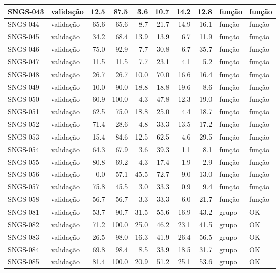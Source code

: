 \begin{small}
\begin{longtable}{|l|l|r|r|r|r|r|r|l|l|}
SNGS-043 & validação & 12.5 & 87.5 & 3.6 & 10.7 & 14.2 & 12.8 & função & função \\ \hline
SNGS-044 & validação & 65.6 & 65.6 & 8.7 & 21.7 & 14.9 & 16.1 & função & função \\ \hline
SNGS-045 & validação & 34.2 & 68.4 & 13.9 & 13.9 & 6.7 & 11.9 & função & função \\ \hline
SNGS-046 & validação & 75.0 & 92.9 & 7.7 & 30.8 & 6.7 & 35.7 & função & função \\ \hline
SNGS-047 & validação & 11.5 & 11.5 & 7.7 & 23.1 & 4.1 & 5.2 & função & função \\ \hline
SNGS-048 & validação & 26.7 & 26.7 & 10.0 & 70.0 & 16.6 & 16.4 & função & função \\ \hline
SNGS-049 & validação & 10.0 & 90.0 & 18.8 & 18.8 & 19.6 & 8.6 & função & função \\ \hline
SNGS-050 & validação & 60.9 & 100.0 & 4.3 & 47.8 & 12.3 & 19.0 & função & função \\ \hline
SNGS-051 & validação & 62.5 & 75.0 & 18.8 & 25.0 & 4.4 & 18.7 & função & função \\ \hline
SNGS-052 & validação & 71.4 & 28.6 & 4.8 & 33.3 & 13.5 & 17.2 & função & função \\ \hline
SNGS-053 & validação & 15.4 & 84.6 & 12.5 & 62.5 & 4.6 & 29.5 & função & função \\ \hline
SNGS-054 & validação & 64.3 & 67.9 & 3.6 & 39.3 & 1.1 & 8.1 & função & função \\ \hline
SNGS-055 & validação & 80.8 & 69.2 & 4.3 & 17.4 & 1.9 & 2.9 & função & função \\ \hline
SNGS-056 & validação & 0.0 & 57.1 & 45.5 & 72.7 & 9.0 & 13.0 & função & função \\ \hline
SNGS-057 & validação & 75.8 & 45.5 & 3.0 & 33.3 & 0.9 & 9.4 & função & função \\ \hline
SNGS-058 & validação & 56.7 & 56.7 & 3.3 & 33.3 & 6.0 & 21.7 & função & função \\ \hline
SNGS-081 & validação & 53.7 & 90.7 & 31.5 & 55.6 & 16.9 & 43.2 & grupo & OK \\ \hline
SNGS-082 & validação & 71.2 & 100.0 & 25.0 & 46.2 & 23.1 & 41.5 & grupo & OK \\ \hline
SNGS-083 & validação & 26.5 & 98.0 & 16.3 & 41.9 & 26.4 & 56.5 & grupo & OK \\ \hline
SNGS-084 & validação & 69.8 & 98.4 & 8.5 & 33.9 & 18.5 & 31.7 & grupo & OK \\ \hline
SNGS-085 & validação & 81.4 & 100.0 & 20.9 & 51.2 & 25.1 & 53.6 & grupo & OK \\ \hline

\end{longtable}
\end{small}
